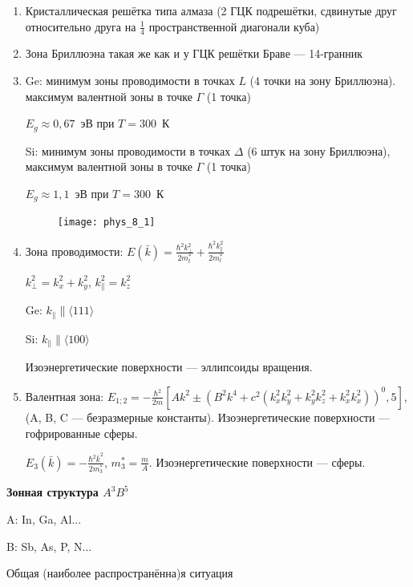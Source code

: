 \begin{enumerate}
    \item Кристаллическая решётка типа алмаза (2 ГЦК подрешётки, сдвинутые друг относительно друга на $\frac{1}{4}$ пространственной диагонали куба)
    \item Зона Бриллюэна такая же как и у ГЦК решётки Браве --- 14-гранник
    \item Ge: минимум зоны проводимости в точках $L$ (4 точки на зону Бриллюэна). максимум валентной зоны в точке $\Gamma$ (1 точка)
    
    $E_g \approx 0,67$~эВ при $T=300$~К

    Si: минимум зоны проводимости в точках $\Delta$ (6 штук на зону Бриллюэна), максимум валентной зоны в точке $\Gamma$ (1 точка)
    
    $E_g \approx 1,1$~эВ при $T=300$~К

    \begin{figure}[h!]
        \centering
        \texttt{[image: phys\_8\_1]}
    \end{figure}

    \item Зона проводимости: $\displaystyle E(\bar{k}) = \frac{\hbar^2 k_\perp ^2}{2m_t^*} + \frac{\hbar^2 k_\parallel ^2}{2m_l^*}$
    
    $k_\perp ^2 = k_x ^2 + k_y ^2$, $k^2_\parallel = k^2 _z$

    Ge: $k_\parallel \parallel \langle 111 \rangle$

    Si: $k_\parallel \parallel \langle 100 \rangle$

    Изоэнергетические поверхности --- эллипсоиды вращения.

    \item Валентная зона: $\displaystyle E_{1;2}=-\frac{\hbar^2}{2m}\left[ Ak^2 \pm \left( B^2k^4 + c^2(k_x^2k_y^2+ k_y^2k_z^2 + k_x^2k_x^2) \right)^0,5 \right]$, (A, B, C --- безразмерные константы). Изоэнергетические поверхности --- гофрированные сферы.
    
    $E_3 (\bar{k})=-\frac{\hbar^2 \bar{k}^2}{2m^*_3}$, $m^*_3=\frac{m}{A}$. Изоэнергетические поверхности --- сферы.
\end{enumerate}





\textbf{Зонная структура $A^3B^5$}

A: In, Ga, Al...

B: Sb, As, P, N...

Общая (наиболее распространённа)я ситуация

